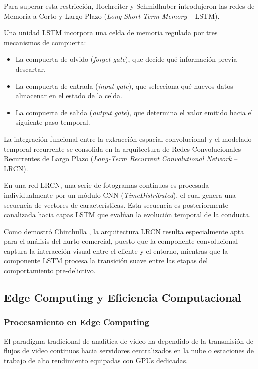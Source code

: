 Para superar esta restricción, Hochreiter y Schmidhuber introdujeron las redes de Memoria a Corto y Largo Plazo (\textit{Long Short-Term Memory} -- LSTM).

Una unidad LSTM incorpora una celda de memoria regulada por tres mecanismos de compuerta:

\begin{itemize}
    \item La compuerta de olvido (\textit{forget gate}), que decide qué información previa descartar.

    \item La compuerta de entrada (\textit{input gate}), que selecciona qué nuevos datos almacenar en el estado de la celda.

    \item La compuerta de salida (\textit{output gate}), que determina el valor emitido hacia el siguiente paso temporal.
\end{itemize}

La integración funcional entre la extracción espacial convolucional y el modelado temporal recurrente se consolida en la arquitectura de Redes Convolucionales Recurrentes de Largo Plazo (\textit{Long-Term Recurrent Convolutional Network} -- LRCN).

En una red LRCN, una serie de fotogramas continuos es procesada individualmente por un módulo CNN (\textit{TimeDistributed}), el cual genera una secuencia de vectores de características. Esta secuencia es posteriormente canalizada hacia capas LSTM que evalúan la evolución temporal de la conducta.

Como demostró Chinthulla \cite{chinthulla_deep_2025}, la arquitectura LRCN resulta especialmente apta para el análisis del hurto comercial, puesto que la componente convolucional captura la interacción visual entre el cliente y el entorno, mientras que la componente LSTM procesa la transición suave entre las etapas del comportamiento pre-delictivo.


\subsection{Edge Computing y Eficiencia Computacional}

\subsubsection{Procesamiento en Edge Computing}

El paradigma tradicional de analítica de video ha dependido de la transmisión de flujos de video continuos hacia servidores centralizados en la nube o estaciones de trabajo de alto rendimiento equipadas con GPUs dedicadas.

